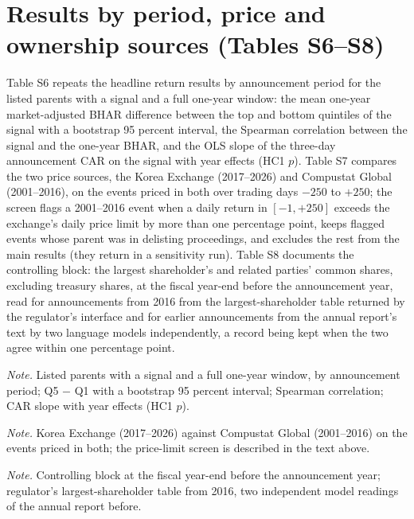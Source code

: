 \documentclass[12pt]{article}
\newcommand{\tabnote}[1]{\par\vspace{4pt}\begin{minipage}{\linewidth}\singlespacing\small\emph{Note.} #1\end{minipage}}
\begin{document}
\section{Results by period, price and ownership sources (Tables S6--S8)}
Table S6 repeats the headline return results by announcement period for the listed parents with a signal and a full one-year window: the mean one-year market-adjusted BHAR difference between the top and bottom quintiles of the signal with a bootstrap 95 percent interval, the Spearman correlation between the signal and the one-year BHAR, and the OLS slope of the three-day announcement CAR on the signal with year effects (HC1 $p$). Table S7 compares the two price sources, the Korea Exchange (2017--2026) and Compustat Global (2001--2016), on the events priced in both over trading days $-250$ to $+250$; the screen flags a 2001--2016 event when a daily return in $[-1, +250]$ exceeds the exchange's daily price limit by more than one percentage point, keeps flagged events whose parent was in delisting proceedings, and excludes the rest from the main results (they return in a sensitivity run). Table S8 documents the controlling block: the largest shareholder's and related parties' common shares, excluding treasury shares, at the fiscal year-end before the announcement year, read for announcements from 2016 from the largest-shareholder table returned by the regulator's interface and for earlier announcements from the annual report's text by two language models independently, a record being kept when the two agree within one percentage point.
\begin{table}[htbp]\centering\caption{Headline return results by period}\label{tab:s_period}
{\footnotesize\setlength{\tabcolsep}{3pt}}\tabnote{Listed parents with a signal and a full one-year window, by announcement period; Q5 $-$ Q1 with a bootstrap 95 percent interval; Spearman correlation; CAR slope with year effects (HC1 $p$).}\end{table}
\begin{table}[htbp]\centering\caption{Two price sources: cross-check and screen}\label{tab:s_prices}
{\footnotesize\setlength{\tabcolsep}{3pt}}\tabnote{Korea Exchange (2017--2026) against Compustat Global (2001--2016) on the events priced in both; the price-limit screen is described in the text above.}\end{table}
\begin{table}[htbp]\centering\caption{Pre-announcement ownership: two sources and their agreement}\label{tab:s_ownership}
{\footnotesize\setlength{\tabcolsep}{3pt}}\tabnote{Controlling block at the fiscal year-end before the announcement year; regulator's largest-shareholder table from 2016, two independent model readings of the annual report before.}\end{table}
\end{document}
